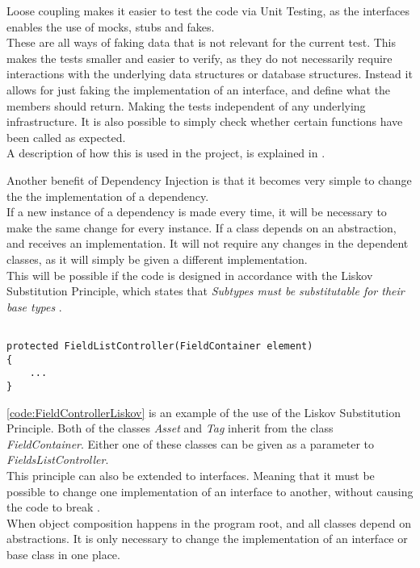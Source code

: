 Loose coupling makes it easier to test the code via Unit Testing, as the interfaces enables the use of mocks, stubs and fakes. \\
These are all ways of faking data that is not relevant for the current test. This makes the tests smaller and easier to verify, as they do not necessarily require interactions with the underlying data structures or database structures. Instead it allows for just faking the implementation of an interface, and define what the members should return. Making the tests independent of any underlying infrastructure. It is also possible to simply check whether certain functions have been called as expected.\\
A description of how this is used in the project, is explained in . \par
{}
Another benefit of Dependency Injection is that it becomes very simple to change the the implementation of a dependency. \\
If a new instance of a dependency is made every time, it will be necessary to make the same change for every instance. If a class depends on an abstraction, and receives an implementation. It will not require any changes in the dependent classes, as it will simply be given a different implementation. \\
This will be possible if the code is designed in accordance with the Liskov Substitution Principle, which states that \textit{Subtypes must be substitutable for their base types} \citep{AgilePPP}. 
\par
\begin{listing}[H]
\begin{verbatim}

protected FieldListController(FieldContainer element)
{
    ...
}

\end{verbatim}
\label{code:FieldControllerLiskov}
\end{listing}

\autoref{code:FieldControllerLiskov} is an example of the use of the Liskov Substitution Principle. Both of the classes \textit{Asset} and \textit{Tag} inherit from the class \textit{FieldContainer}. Either one of these classes can be given as a parameter to \textit{FieldsListController}. 
\\
This principle can also be extended to interfaces. Meaning that it must be possible to change one implementation of an interface to another, without causing the code to break \citep{seemann2019dependency}. 
\\
When object composition happens in the program root, and all classes depend on abstractions. It is only necessary to change the implementation of an interface or base class in one place.

